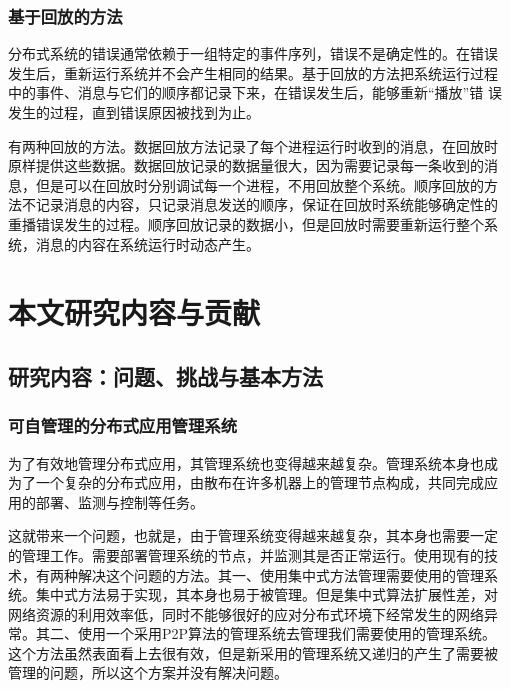 \subsubsection*{基于回放的方法}

分布式系统的错误通常依赖于一组特定的事件序列，错误不是确定性的。在错误
发生后，重新运行系统并不会产生相同的结果。基于回放的方法把系统运行过程
中的事件、消息与它们的顺序都记录下来，在错误发生后，能够重新“播放”错
误发生的过程，直到错误原因被找到为止。

有两种回放的方法。数据回放方法记录了每个进程运行时收到的消息，在回放时
原样提供这些数据。数据回放记录的数据量很大，因为需要记录每一条收到的消
息，但是可以在回放时分别调试每一个进程，不用回放整个系统。顺序回放的方
法不记录消息的内容，只记录消息发送的顺序，保证在回放时系统能够确定性的
重播错误发生的过程。顺序回放记录的数据小，但是回放时需要重新运行整个系
统，消息的内容在系统运行时动态产生。

% 
% 
% 
% 
% 
% 
% 
% 
% 
% 


\section{本文研究内容与贡献}

\subsection{研究内容：问题、挑战与基本方法}

\subsubsection*{可自管理的分布式应用管理系统}

为了有效地管理分布式应用，其管理系统也变得越来越复杂。管理系统本身也成
为了一个复杂的分布式应用，由散布在许多机器上的管理节点构成，共同完成应
用的部署、监测与控制等任务。

这就带来一个问题，也就是，由于管理系统变得越来越复杂，其本身也需要一定
的管理工作。需要部署管理系统的节点，并监测其是否正常运行。使用现有的技
术，有两种解决这个问题的方法。其一、使用集中式方法管理需要使用的管理系
统。集中式方法易于实现，其本身也易于被管理。但是集中式算法扩展性差，对
网络资源的利用效率低，同时不能够很好的应对分布式环境下经常发生的网络异
常。其二、使用一个采用P2P算法的管理系统去管理我们需要使用的管理系统。
这个方法虽然表面看上去很有效，但是新采用的管理系统又递归的产生了需要被
管理的问题，所以这个方案并没有解决问题。

